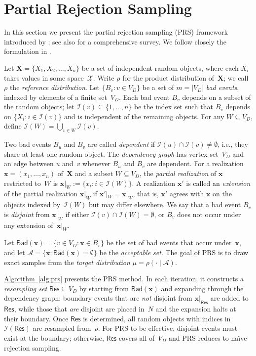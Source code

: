 \documentclass[12pt, a4paper]{article}
\theoremstyle{plain}
\theoremstyle{definition}
\theoremstyle{remark}
\newcommand{\mc}{\mathcal}
\renewcommand{\v}[1]{\boldsymbol{#1}}
\newcommand{\mx}{\v{x}}
\newcommand{\mX}{\v{X}}
\newcommand{\sref}[2]{\hyperref[#2]{#1~\ref*{#2}}}
\newcommand{\bad}{\mathsf{Bad}}
\newcommand{\res}{\mathsf{Res}}
\begin{document}
\section{Partial Rejection Sampling}\label{sec:prs}

In this section we present the partial rejection sampling (PRS) framework introduced by \cite{GJL17}; see also \cite{FGY24} for a comprehensive survey. We follow closely the formulation in \cite{MK20}.

Let \(\mX = \{X_1, X_2, \ldots, X_n\}\) be a set of independent random objects, where each \(X_i\) takes values in some space~\(\mc X\). Write \(\rho\) for the product distribution of~\(\mX\); we call \(\rho\) the {\em reference distribution}. Let \(\{B_v : v \in V_D\}\) be a set of \(m=|V_D|\) {\em bad events}, indexed by elements of a finite set~\(V_D\). Each bad event \(B_v\) depends on a subset of the random objects; let \(\mc I(v) \subseteq \{1,\ldots,n\}\) be the index set such that \(B_v\) depends on \(\{X_i : i \in \mc I(v)\}\) and is independent of the remaining objects. For any \(W \subseteq V_D\), define \(\mc I(W) = \bigcup_{v \in W} \mc I(v)\).

Two bad events \(B_u\) and \(B_v\) are called {\em dependent} if \(\mc I(u) \cap \mc I(v) \neq \emptyset\), i.e., they share at least one random object. The {\em dependency graph} has vertex set~\(V_D\) and an edge between \(u\) and~\(v\) whenever \(B_u\) and \(B_v\) are dependent. For a realization \(\mx = (x_1,\ldots,x_n)\) of~\(\mX\) and a subset \(W \subseteq V_D\), the {\em partial realization} of \(\mx\) restricted to~\(W\) is \(\mx|_W := \{x_i : i \in \mc I(W)\}\). A realization \(\mx'\) is called an {\em extension} of the partial realization \(\mx|_W\) if \(\mx'|_W = \mx|_W\), that is, \(\mx'\) agrees with \(\mx\) on the objects indexed by~\(\mc I(W)\) but may differ elsewhere. We say that a bad event \(B_v\) is {\em disjoint} from \(\mx|_W\) if either \(\mc I(v) \cap \mc I(W) = \emptyset\), or \(B_v\) does not occur under any extension of~\(\mx|_W\).

Let \(\bad(\mx) = \{v \in V_D : \mx \in B_v\}\) be the set of bad events that occur under~\(\mx\), and let \(\mc A = \{\mx : \bad(\mx) = \emptyset\}\) be the {\em acceptable set}. The goal of PRS is to draw exact samples from the {\em target distribution} \(\mu = \rho(\cdot \mid \mc A)\).

\sref{Algorithm}{alg:prs} presents the PRS method. In each iteration, it constructs a {\em resampling set} \(\res \subseteq V_D\) by starting from \(\bad(\mx)\) and expanding through the dependency graph: boundary events that are {\em not} disjoint from \(\mx|_{\res}\) are added to \(\res\), while those that {\em are} disjoint are placed in~\(N\) and the expansion halts at their boundary. Once \(\res\) is determined, all random objects with indices in \(\mc I(\res)\) are resampled from~\(\rho\). For PRS to be effective, disjoint events must exist at the boundary; otherwise, \(\res\) covers all of~\(V_D\) and PRS reduces to na\"{i}ve rejection sampling.
\end{document}
